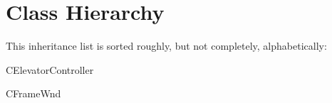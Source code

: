 \section{Class Hierarchy}
This inheritance list is sorted roughly, but not completely, alphabetically\+:\begin{DoxyCompactList}
\item C\+Elevator\+Controller\begin{DoxyCompactList}
\item {}
\end{DoxyCompactList}
\item {}
\item C\+Frame\+Wnd\begin{DoxyCompactList}
\item {}
\end{DoxyCompactList}
\end{DoxyCompactList}
